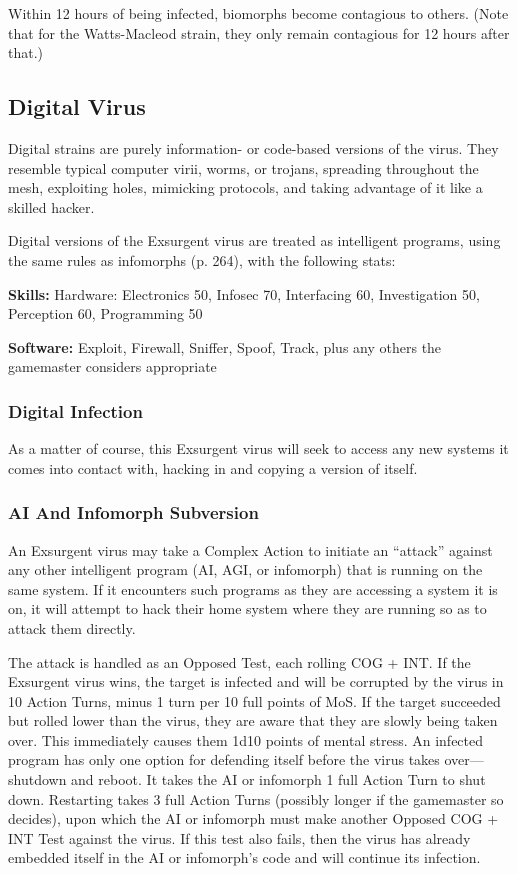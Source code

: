 Within 12 hours of being infected, biomorphs become contagious to others. (Note that for the Watts-Macleod strain, they only remain contagious for 12 hours after that.) 

\subsection{Digital Virus} 

Digital strains are purely information- or code-based versions of the virus. They resemble typical computer virii, worms, or trojans, spreading throughout the mesh, exploiting holes, mimicking protocols, and taking advantage of it like a skilled hacker. 

Digital versions of the Exsurgent virus are treated as intelligent programs, using the same rules as infomorphs (p. 264), with the following stats: 

\textbf{Skills:} Hardware: Electronics 50, Infosec 70, Interfacing 60, Investigation 50, Perception 60, Programming 50 

\textbf{Software:} Exploit, Firewall, Sniffer, Spoof, Track, plus any others the gamemaster considers appropriate 

\subsubsection{Digital Infection} 

As a matter of course, this Exsurgent virus will seek to access any new systems it comes into contact with, hacking in and copying a version of itself. 

\subsubsection{AI And Infomorph Subversion} 

An Exsurgent virus may take a Complex Action to initiate an ``attack'' against any other intelligent program (AI, AGI, or infomorph) that is running on the same system. If it encounters such programs as they are accessing a system it is on, it will attempt to hack their home system where they are running so as to attack them directly. 

The attack is handled as an Opposed Test, each rolling COG + INT. If the Exsurgent virus wins, the target is infected and will be corrupted by the virus in 10 Action Turns, minus 1 turn per 10 full points of MoS. If the target succeeded but rolled lower than the virus, they are aware that they are slowly being taken over. This immediately causes them 1d10 points of mental stress. An infected program has only one option for defending itself before the virus takes over—shutdown and reboot. It takes the AI or infomorph 1 full Action Turn to shut down. Restarting takes 3 full Action Turns (possibly longer if the gamemaster so decides), upon which the AI or infomorph must make another Opposed COG + INT Test against the virus. If this test also fails, then the virus has already embedded itself in the AI or infomorph's code and will continue its infection. 

